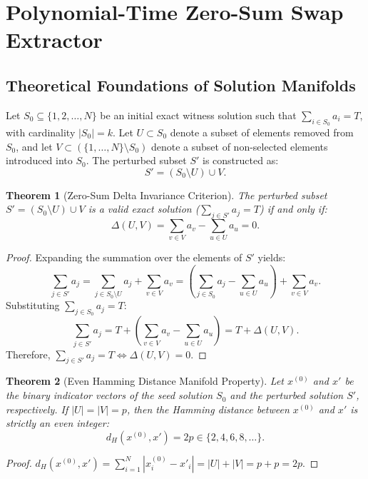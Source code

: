 \documentclass[journal,onecolumn,11pt]{IEEEtran}
\newtheorem{theorem}{Theorem}
\begin{document}
\section{Polynomial-Time Zero-Sum Swap Extractor}
\label{sec:swap_manifold}

\subsection{Theoretical Foundations of Solution Manifolds}
Let $S_0 \subseteq \{1, 2, \dots, N\}$ be an initial exact witness solution such that $\sum_{i \in S_0} a_i = T$, with cardinality $|S_0| = k$. Let $U \subset S_0$ denote a subset of elements removed from $S_0$, and let $V \subset (\{1, \dots, N\} \setminus S_0)$ denote a subset of non-selected elements introduced into $S_0$. The perturbed subset $S'$ is constructed as:
\begin{equation}
    S' = (S_0 \setminus U) \cup V.
\end{equation}

\begin{theorem}[Zero-Sum Delta Invariance Criterion]
\label{thm:zero_sum}
The perturbed subset $S' = (S_0 \setminus U) \cup V$ is a valid exact solution ($\sum_{j \in S'} a_j = T$) if and only if:
\begin{equation}
    \Delta(U, V) = \sum_{v \in V} a_v - \sum_{u \in U} a_u = 0.
    \label{eq:zero_sum_delta}
\end{equation}
\end{theorem}
\begin{proof}
Expanding the summation over the elements of $S'$ yields:
\begin{equation}
    \sum_{j \in S'} a_j = \sum_{j \in S_0 \setminus U} a_j + \sum_{v \in V} a_v = \left( \sum_{j \in S_0} a_j - \sum_{u \in U} a_u \right) + \sum_{v \in V} a_v.
\end{equation}
Substituting $\sum_{j \in S_0} a_j = T$:
\begin{equation}
    \sum_{j \in S'} a_j = T + \left( \sum_{v \in V} a_v - \sum_{u \in U} a_u \right) = T + \Delta(U, V).
\end{equation}
Therefore, $\sum_{j \in S'} a_j = T \iff \Delta(U, V) = 0$.
\end{proof}

\begin{theorem}[Even Hamming Distance Manifold Property]
\label{thm:hamming}
Let $x^{(0)}$ and $x'$ be the binary indicator vectors of the seed solution $S_0$ and the perturbed solution $S'$, respectively. If $|U| = |V| = p$, then the Hamming distance between $x^{(0)}$ and $x'$ is strictly an even integer:
\begin{equation}
    d_H(x^{(0)}, x') = 2p \in \{2, 4, 6, 8, \dots\}.
\end{equation}
\end{theorem}
\begin{proof}
$d_H(x^{(0)}, x') = \sum_{i=1}^N |x_i^{(0)} - x'_i| = |U| + |V| = p + p = 2p$.
\end{proof}
\end{document}
